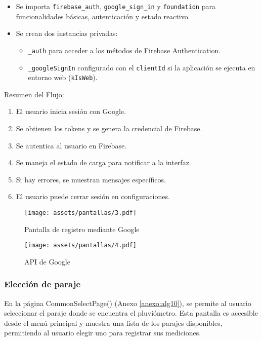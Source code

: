 \begin{itemize}
    \item Se importa \texttt{firebase\_auth}, \texttt{google\_sign\_in} y \texttt{foundation} para funcionalidades básicas, autenticación y estado reactivo.
    \item Se crean dos instancias privadas:
    \begin{itemize}
        \item \texttt{\_auth} para acceder a los métodos de Firebase Authentication.
        \item \texttt{\_googleSignIn} configurado con el \texttt{clientId} si la aplicación se ejecuta en entorno web (\texttt{kIsWeb}).
    \end{itemize}
\end{itemize}


Resumen del Flujo:

\begin{enumerate}
    \item El usuario inicia sesión con Google.
    \item Se obtienen los tokens y se genera la credencial de Firebase.
    \item Se autentica al usuario en Firebase.
    \item Se maneja el estado de carga para notificar a la interfaz.
    \item Si hay errores, se muestran mensajes específicos.
    \item El usuario puede cerrar sesión en configuraciones.
\end{enumerate}


\begin{figure}[h!]
\centering
  \texttt{[image: assets/pantallas/3.pdf]}
  \caption{Pantalla de registro mediante Google}
  \label{pantallas2}
\end{figure}

\begin{figure}[h!]
\centering
  \texttt{[image: assets/pantallas/4.pdf]}
  \caption{API de Google}
  \label{pantallas4}
\end{figure}


\newpage
\subsubsection*{Elección de paraje}


En la página CommonSelectPage() (Anexo \ref{anexo:alg10}), se permite al usuario seleccionar el paraje donde se encuentra el pluviómetro. Esta pantalla es accesible desde el menú principal y muestra una lista de los parajes disponibles, permitiendo al usuario elegir uno para registrar sus mediciones.


